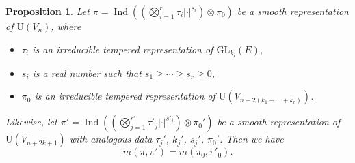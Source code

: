 \documentclass[11pt]{amsart}
\numberwithin{equation}{section}
\theoremstyle{plain}
\newtheorem{prop}[thm]{Proposition}
\theoremstyle{definition}
\theoremstyle{remark}
\def\Ind{\operatorname{Ind}}
\def\GL{\mathrm{GL}}
\def\U{\mathrm{U}}
\begin{document}
\begin{prop}
\label{prop:mult}
Let $\pi = \Ind ((\bigotimes_{i=1}^r \tau_i |\cdot|^{s_i}) \otimes \pi_0)$ be a smooth representation of $\U(V_n)$, where 
\begin{itemize}
 \item $\tau_i$ is an irreducible tempered representation of $\GL_{k_i}(E)$,
 \item $s_i$ is a real number such that $s_1 \ge \cdots \ge s_r \ge 0$,
 \item $\pi_0$ is an irreducible tempered representation of $\U(V_{n-2(k_1+\dots+k_r)})$.
\end{itemize}
Likewise, let $\pi' = \Ind((\bigotimes_{j=1}^{r'} \tau'_j |\cdot|^{s'_j}) \otimes \pi_0')$ be a smooth representation of $\U(V_{n+2k+1})$ with analogous data $\tau_j'$, $k_j'$, $s_j'$, $\pi_0'$.
Then we have
\[
 m(\pi, \pi') = m(\pi_0, \pi'_0).
\]
\end{prop}
\end{document}
